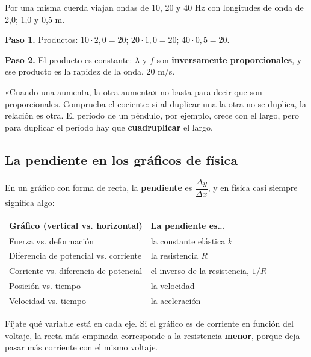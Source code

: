 \begin{ejemplo} Por una misma cuerda viajan ondas de 10, 20 y 40 Hz con longitudes de onda de 2,0; 1,0 y 0,5 m.\par \textbf{Paso 1.} Productos: $10\cdot 2{,}0 = 20$; $20\cdot 1{,}0 = 20$; $40\cdot 0{,}5 = 20$.\par \textbf{Paso 2.} El producto es constante: $\lambda$ y $f$ son \textbf{inversamente proporcionales}, y ese producto es la rapidez de la onda, 20 m/s.\end{ejemplo}
 
\begin{clave}[{Recuerda}] «Cuando una aumenta, la otra aumenta» no basta para decir que son proporcionales. Comprueba el cociente: si al duplicar una la otra no se duplica, la relación es otra. El período de un péndulo, por ejemplo, crece con el largo, pero para duplicar el período hay que \textbf{cuadruplicar} el largo.\end{clave}
\subsection{La pendiente en los gráficos de física}
En un gráfico con forma de recta, la \textbf{pendiente} es $\dfrac{\Delta y}{\Delta x}$, y en física casi siempre significa algo:

 
\begin{center}\small
\begin{tabularx}{\linewidth}{@{}>{\raggedright\arraybackslash\hsize=1.03\hsize}X>{\raggedright\arraybackslash\hsize=0.97\hsize}X@{}}
\toprule
\textbf{Gráfico (vertical vs. horizontal)} & \textbf{La pendiente es\dots{}} \\
\midrule
Fuerza vs. deformación & la constante elástica $k$ \\
Diferencia de potencial vs. corriente & la resistencia $R$ \\
Corriente vs. diferencia de potencial & el inverso de la resistencia, $1/R$ \\
Posición vs. tiempo & la velocidad \\
Velocidad vs. tiempo & la aceleración \\
\bottomrule
\end{tabularx}
\end{center}
 
\begin{clave}[{Recuerda}] Fíjate qué variable está en cada eje. Si el gráfico es de corriente en función del voltaje, la recta más empinada corresponde a la resistencia \textbf{menor}, porque deja pasar más corriente con el mismo voltaje.\end{clave}
  
